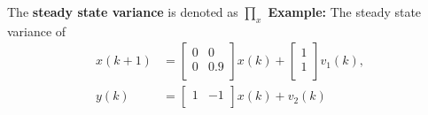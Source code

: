\begin{multicols}{2}
The \textbf{steady state variance} is denoted as $\prod_x$\newline
\textbf{Example:}
The steady state variance of 
\begin{align*}
    x(k+1) &= 
    \begin{bmatrix}
        0 & 0 \\
        0 & 0.9 \\
    \end{bmatrix}x(k) +
    \begin{bmatrix}
        1 \\
        1 \\
    \end{bmatrix} v_1(k), \\
    y(k) &= 
    \begin{bmatrix}
        1 & -1 \\
    \end{bmatrix} x(k) + v_2(k)
\end{align*}



\end{multicols}
